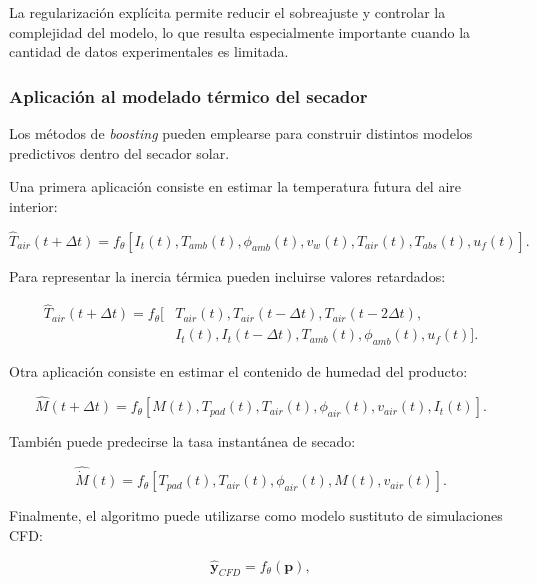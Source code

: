La regularización explícita permite reducir el sobreajuste y controlar la complejidad del modelo, lo que resulta especialmente importante cuando la cantidad de datos experimentales es limitada.

\subsubsection{Aplicación al modelado térmico del secador}

Los métodos de \textit{boosting} pueden emplearse para construir distintos modelos predictivos dentro del secador solar.

Una primera aplicación consiste en estimar la temperatura futura del aire interior:

\begin{equation}
\hat{T}_{air}(t+\Delta t)
=
f_{\theta}
\left[
I_t(t),
T_{amb}(t),
\phi_{amb}(t),
v_w(t),
T_{air}(t),
T_{abs}(t),
u_f(t)
\right].
\end{equation}

Para representar la inercia térmica pueden incluirse valores retardados:

\begin{equation}
\begin{aligned}
\hat{T}_{air}(t+\Delta t)
=
f_{\theta}
\Big[
&
T_{air}(t),
T_{air}(t-\Delta t),
T_{air}(t-2\Delta t),
\\
&
I_t(t),
I_t(t-\Delta t),
T_{amb}(t),
\phi_{amb}(t),
u_f(t)
\Big].
\end{aligned}
\end{equation}

Otra aplicación consiste en estimar el contenido de humedad del producto:

\begin{equation}
\hat{M}(t+\Delta t)
=
f_{\theta}
\left[
M(t),
T_{pad}(t),
T_{air}(t),
\phi_{air}(t),
v_{air}(t),
I_t(t)
\right].
\end{equation}

También puede predecirse la tasa instantánea de secado:

\begin{equation}
\widehat{\dot{M}}(t)
=
f_{\theta}
\left[
T_{pad}(t),
T_{air}(t),
\phi_{air}(t),
M(t),
v_{air}(t)
\right].
\end{equation}

Finalmente, el algoritmo puede utilizarse como modelo sustituto de simulaciones CFD:

\begin{equation}
\hat{\mathbf{y}}_{CFD}
=
f_{\theta}
\left(
\mathbf{p}
\right),
\end{equation}

